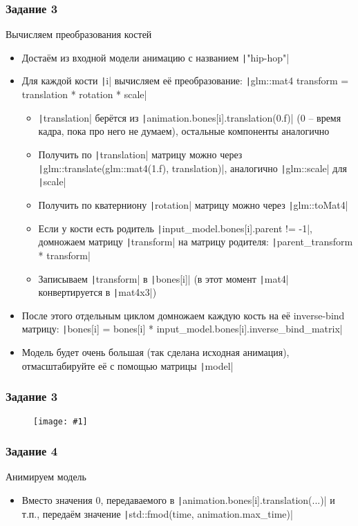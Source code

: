 \documentclass{beamer}
\newcommand{\slideimage}[1]{
  \begin{figure}
    \begin{adjustbox}{width=\textwidth, totalheight=\textheight-2\baselineskip-2\baselineskip,keepaspectratio}
      \texttt{[image: \#1]}
    \end{adjustbox}
  \end{figure}
}
\begin{document}
\begin{frame}[fragile]
\frametitle{Задание 3}
\fontsize{8pt}{8pt}
\selectfont
Вычисляем преобразования костей
\begin{itemize}
\item Достаём из входной модели анимацию с названием \texttt|"hip-hop"|
\item Для каждой кости \texttt|i| вычисляем её преобразование: \texttt|glm::mat4 transform = translation * rotation * scale|
\begin{itemize}
\fontsize{8pt}{8pt}
\selectfont
\item \texttt|translation| берётся из \texttt|animation.bones[i].translation(0.f)| (0 -- время кадра, пока про него не думаем), остальные компоненты аналогично
\item Получить по \texttt|translation| матрицу можно через \texttt|glm::translate(glm::mat4(1.f), translation)|, аналогично \texttt|glm::scale| для \texttt|scale|
\item Получить по кватерниону \texttt|rotation| матрицу можно через \texttt|glm::toMat4|
\item Если у кости есть родитель \texttt|input_model.bones[i].parent != -1|, домножаем матрицу \texttt|transform| на матрицу родителя: \texttt|parent_transform * transform|
\item Записываем \texttt|transform| в \texttt|bones[i]| (в этот момент \texttt|mat4| конвертируется в \texttt|mat4x3|)
\end{itemize}
\item После этого отдельным циклом домножаем каждую кость на её inverse-bind матрицу: \texttt|bones[i] = bones[i] * input_model.bones[i].inverse_bind_matrix|
\item Модель будет очень большая (так сделана исходная анимация), отмасштабируйте её с помощью матрицы \texttt|model|
\end{itemize}
\end{frame}

\begin{frame}[fragile]
\frametitle{Задание 3}
\slideimage{3.png}
\end{frame}

\begin{frame}[fragile]
\frametitle{Задание 4}
Анимируем модель
\begin{itemize}
\item Вместо значения 0, передаваемого в \texttt|animation.bones[i].translation(...)| и т.п., передаём значение \texttt|std::fmod(time, animation.max_time)|
\end{itemize}
\end{frame}
\end{document}
